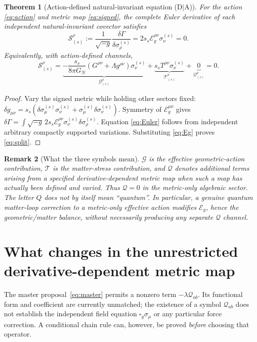 \documentclass[11pt,a4paper]{article}
\newtheorem{theorem}{Theorem}[section]
\newtheorem{remark}[theorem]{Remark}
\newcommand{\cE}{\mathcal E}
\newcommand{\cG}{\mathscr G}
\newcommand{\cT}{\mathscr T}
\newcommand{\cQ}{\mathscr Q}
\newcommand{\cS}{\mathscr S}
\begin{document}
\begin{theorem}[Action-defined natural-invariant equation (D$\mid$A)]
\label{thm:projection}
For the action \eqref{eq:action} and metric map \eqref{eq:signed},
the complete Euler derivative of each independent natural-invariant
covector satisfies
\begin{equation}\label{eq:Euler}
\boxed{\cS_{(s)}^\rho
:=\frac1{\sqrt{-g}}\frac{\delta\Gamma}
{\delta\sigma^{(s)}_\rho}
=2s_s\cE_g^{\rho\nu}\sigma^{(s)}_\nu=0.}
\end{equation}
Equivalently, with \emph{action-defined} channels,
\begin{equation}\label{eq:split}
\boxed{\cS_{(s)}^\rho
=\underbrace{-\frac{s_s}{8\pi G_N}
\left(G^{\rho\nu}+\Lambda g^{\rho\nu}\right)
\sigma^{(s)}_\nu}_{\displaystyle\cG_{(s)}^\rho}
+\underbrace{s_s T^{\rho\nu}\sigma^{(s)}_\nu}
_{\displaystyle\cT_{(s)}^\rho}
+\underbrace{0}_{\displaystyle\cQ_{(s)}^\rho}=0.}
\end{equation}
\end{theorem}
\begin{proof}
Vary the signed metric while holding other sectors fixed:
$\delta g_{\mu\nu}=s_s(\delta\sigma^{(s)}_\mu
\sigma^{(s)}_\nu+\sigma^{(s)}_\mu\delta\sigma^{(s)}_\nu)$.
Symmetry of $\cE_g^{\mu\nu}$ gives
$\delta\Gamma=\int\sqrt{-g}\,2s_s\cE_g^{\rho\nu}
\sigma^{(s)}_\nu\delta\sigma^{(s)}_\rho$.
Equation \eqref{eq:Euler} follows from independent arbitrary
compactly supported variations. Substituting \eqref{eq:Eg}
proves \eqref{eq:split}.
\end{proof}

\begin{remark}[What the three symbols mean]
$\cG$ is the effective \emph{geometric-action contribution}, $\cT$
is the \emph{matter-stress contribution}, and $\cQ$ denotes additional
terms arising from a \emph{specified} derivative-dependent metric map
when such a map has actually been defined and varied. Thus $\cQ=0$
in the metric-only algebraic sector. The letter $Q$ does \emph{not}
by itself mean ``quantum''. In particular, a genuine quantum
matter-loop correction to a metric-only effective action modifies
$\cE_g$, hence the geometric/matter balance, without necessarily
producing any separate $\cQ$ channel.
\end{remark}


\section{What changes in the unrestricted derivative-dependent metric map}
\label{sec:derivativemap}
The master proposal~\eqref{eq:master} permits a nonzero term
$-\lambda\mathcal Q_{ab}$. Its functional form and coefficient are
currently unmatched; the existence of a symbol $\mathcal Q_{ab}$
does not establish the independent field equation $\square_g\sigma_\mu$
or any particular force correction. A conditional chain rule can,
however, be proved \emph{before} choosing that operator.
\end{document}
